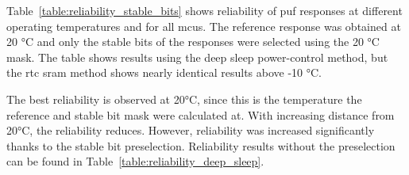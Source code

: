 Table~\ref{table:reliability_stable_bits} shows reliability of \gls{puf} responses at different operating temperatures and for all \glspl{mcu}. The reference response was obtained at 20 °C and only the stable bits of the responses were selected using the 20 °C mask. The table shows results using the deep sleep power-control method, but the \gls{rtc} \gls{sram} method shows nearly identical results above -10 °C.

The best reliability is observed at 20°C, since this is the temperature the reference and stable bit mask were calculated at. With increasing distance from 20°C, the reliability reduces. However, reliability was increased significantly thanks to the stable bit preselection. Reliability results without the preselection can be found in Table~\ref{table:reliability_deep_sleep}.

